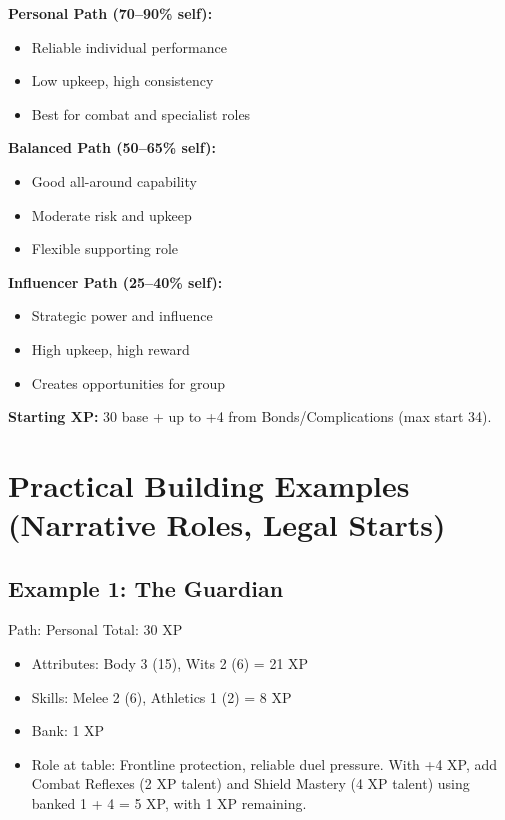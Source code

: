 \documentclass[11pt,twoside,openany]{book}
\begin{document}
\begin{tcolorbox}[colback=gray!5!white, colframe=gray!75!black, title=XP Path Quick Reference, fonttitle=\bfseries]
\textbf{Personal Path (70–90\% self):}
\begin{itemize}
\item Reliable individual performance
\item Low upkeep, high consistency
\item Best for combat and specialist roles
\end{itemize}

\textbf{Balanced Path (50–65\% self):}
\begin{itemize}
\item Good all-around capability
\item Moderate risk and upkeep
\item Flexible supporting role
\end{itemize}

\textbf{Influencer Path (25–40\% self):}
\begin{itemize}
\item Strategic power and influence
\item High upkeep, high reward
\item Creates opportunities for group
\end{itemize}

\textbf{Starting XP:} 30 base + up to +4 from Bonds/Complications (max start 34).
\end{tcolorbox}

\section*{Practical Building Examples (Narrative Roles, Legal Starts)} 

\subsection*{Example 1: The Guardian}

Path: Personal \hfill Total: 30 XP

\begin{itemize}
\item Attributes: Body 3 (15), Wits 2 (6) = 21 XP
\item Skills: Melee 2 (6), Athletics 1 (2) = 8 XP
\item Bank: 1 XP
\item Role at table: Frontline protection, reliable duel pressure. With +4 XP, add Combat Reflexes (2 XP talent) and Shield Mastery (4 XP talent) using banked 1 + 4 = 5 XP, with 1 XP remaining.
\end{itemize}
\end{document}
